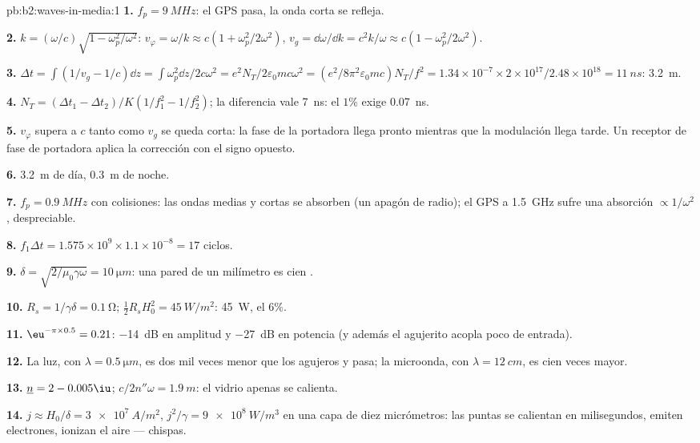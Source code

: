 \begin{solution}{pb:b2:waves-in-media:1}
\textbf{1.} $f_p = \qty{9}{MHz}$: el GPS pasa, la onda corta se refleja.

\textbf{2.} $k = (\omega/c)\sqrt{1 - \omega_p^2/\omega^2}$: $v_\varphi = \omega/k \approx c(1 + \omega_p^2/
2\omega^2)$, $v_g = \dd\omega/\dd k = c^2k/\omega \approx c(1 - \omega_p^2/2\omega^2)$.

\textbf{3.} $\Delta t = \int(1/v_g - 1/c)\dd z = \int\omega_p^2\dd z/2c\omega^2 = e^2N_T/2\varepsilon_0
mc\omega^2 = (e^2/8\pi^2\varepsilon_0mc)N_T/f^2 = 1.34 \times 10^{-7} \times 2 \times 10^{17}/2.48 \times
10^{18} = \qty{11}{ns}$: \qty{3.2}{m}.

\textbf{4.} $N_T = (\Delta t_1 - \Delta t_2)/K(1/f_1^2 - 1/f_2^2)$; la diferencia vale
\qty{7}{ns}: el $1\%$ exige \qty{0.07}{ns}.

\textbf{5.} $v_\varphi$ supera a $c$ tanto como $v_g$ se queda corta: la
fase de la portadora llega pronto mientras que la modulación llega tarde. Un
receptor de fase de portadora aplica la corrección con el signo opuesto.

\textbf{6.} \qty{3.2}{m} de día, \qty{0.3}{m} de noche.

\textbf{7.} $f_p = \qty{0.9}{MHz}$ con colisiones: las ondas medias y cortas se
absorben (un apagón de radio); el GPS a \qty{1.5}{GHz} sufre una absorción
$\propto 1/\omega^2$, despreciable.

\textbf{8.} $f_1\Delta t = 1.575 \times 10^9 \times 1.1 \times 10^{-8} = 17$ ciclos.

\textbf{9.} $\delta = \sqrt{2/\mu_0\gamma\omega} = \qty{10}{\micro m}$: una pared de un milímetro es
cien .

\textbf{10.} $R_s = 1/\gamma\delta = \qty{0.1}{\ohm}$; $\tfrac12R_sH_0^2 = \qty{45}{W/m^2}$: \qty{45}{W},
el $6\%$.

\textbf{11.} $\eu^{-\pi \times 0.5} = 0.21$: \qty{-14}{dB} en amplitud y \qty{-27}{dB} en
potencia (y además el agujerito acopla poco de entrada).

\textbf{12.} La luz, con $\lambda = \qty{0.5}{\micro m}$, es dos mil veces menor
que los agujeros y pasa; la microonda, con $\lambda = \qty{12}{cm}$, es cien
veces mayor.

\textbf{13.} $\underline n = 2 - 0.005\iu$; $c/2n''\omega = \qty{1.9}{m}$: el vidrio apenas
se calienta.

\textbf{14.} $j \approx H_0/\delta = \qty{3e7}{A/m^2}$, $j^2/\gamma = \qty{9e8}{W/m^3}$ en una
capa de diez micrómetros: las puntas se calientan en milisegundos, emiten electrones,
ionizan el aire --- chispas.


\end{solution}
